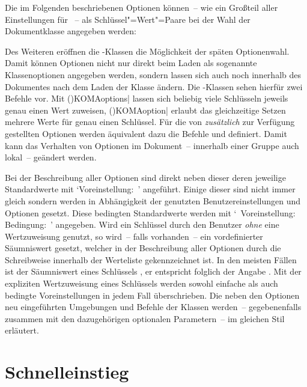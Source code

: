 Die im Folgenden beschriebenen Optionen können~-- wie ein Großteil aller 
Einstellungen für \KOMAScript~-- als Schlüssel"=Wert"=Paare bei der Wahl der 
Dokumentklasse angegeben werden:

Des Weiteren eröffnen die \KOMAScript-Klassen die Möglichkeit der späten 
Optionenwahl. Damit können Optionen nicht nur direkt beim Laden als sogenannte 
Klassenoptionen angegeben werden, sondern lassen sich auch noch innerhalb des 
Dokumentes nach dem Laden der Klasse ändern. Die \KOMAScript-Klassen sehen 
hierfür zwei Befehle vor. Mit 
\Macro(){KOMAoptions|}
lassen sich beliebig viele Schlüsseln jeweils genau einen Wert zuweisen, 
\Macro(){KOMAoption|}
erlaubt das gleichzeitige Setzen mehrere Werte für genau einen Schlüssel. 
Für die von \TUDScript \emph{zusätzlich} zur Verfügung gestellten Optionen
werden äquivalent dazu die Befehle  
und  definiert. Damit kann 
das Verhalten von Optionen im Dokument~-- innerhalb einer Gruppe auch lokal~-- 
geändert werden.

Bei der Beschreibung aller Optionen sind direkt neben dieser deren jeweilige 
Standardwerte mit \mbox{\enquote*{Voreinstellung: }} angeführt. 
Einige dieser sind nicht immer gleich sondern werden in Abhängigkeit der 
genutzten Benutzereinstellungen und Optionen gesetzt. Diese bedingten 
Standardwerte werden mit 
\mbox{\enquote*{%
  Voreinstellung: \,\textbar\,Bedingung: %
}}
angegeben. Wird ein Schlüssel durch den Benutzer \emph{ohne} eine Wertzuweisung 
genutzt, so wird~-- falls vorhanden~-- ein vordefinierter Säumniswert gesetzt, 
welcher in der Beschreibung aller Optionen durch die~ 
Schreibweise innerhalb der Werteliste gekennzeichnet ist. In den meisten Fällen 
ist der Säumniswert eines Schlüssels , er entspricht folglich der 
Angabe . Mit der expliziten Wertzuweisung eines 
Schlüssels werden sowohl einfache als auch bedingte Voreinstellungen in jedem 
Fall überschrieben. Die neben den Optionen neu eingeführten Umgebungen und 
Befehle der Klassen werden~-- gegebenenfalls zusammen mit den dazugehörigen 
optionalen Parametern~-- im gleichen Stil erläutert.



\section{Schnelleinstieg}

